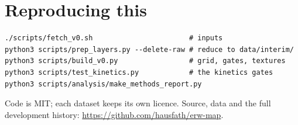 \documentclass[11pt,a4paper]{article}
\begin{document}
\section{Reproducing this}

\begin{verbatim}
./scripts/fetch_v0.sh                       # inputs
python3 scripts/prep_layers.py --delete-raw # reduce to data/interim/
python3 scripts/build_v0.py                 # grid, gates, textures
python3 scripts/test_kinetics.py            # the kinetics gates
python3 scripts/analysis/make_methods_report.py
\end{verbatim}

Code is MIT; each dataset keeps its own licence. Source, data and the full
development history: \url{https://github.com/hausfath/erw-map}.
\end{document}

